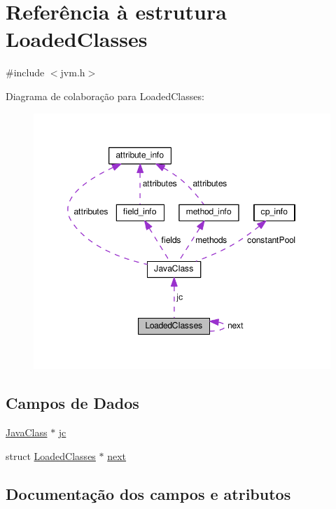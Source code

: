 \hypertarget{structLoadedClasses}{}\section{Referência à estrutura Loaded\+Classes}
\label{structLoadedClasses}


{\ttfamily \#include $<$jvm.\+h$>$}



Diagrama de colaboração para Loaded\+Classes\+:\nopagebreak
\begin{figure}[H]
\begin{center}
\leavevmode
\includegraphics[width=349pt]{structLoadedClasses__coll__graph}
\end{center}
\end{figure}
\subsection*{Campos de Dados}
\begin{DoxyCompactItemize}
\item 
\hyperlink{structJavaClass}{Java\+Class} $\ast$ \hyperlink{structLoadedClasses_a9926f0f305ae1f117b2709b17c9084d8}{jc}
\item 
struct \hyperlink{structLoadedClasses}{Loaded\+Classes} $\ast$ \hyperlink{structLoadedClasses_a66c15555a97e890e2967fac61bb540b8}{next}
\end{DoxyCompactItemize}


\subsection{Documentação dos campos e atributos}
